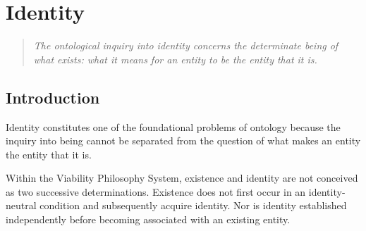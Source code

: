 
%
%
%
%
%
%
%
%
%



\chapter{Identity}
\label{ch:identity}



\def\CurrentChapterID{VS.B01.P01.C01}
\def\CurrentChapterTitle{Identity}



\begin{quote}
\textit{
The ontological inquiry into identity concerns the
determinate being of what exists: what it means for
an entity to be the entity that it is.
}
\end{quote}



\section*{Introduction}

Identity constitutes one of the foundational problems
of ontology because the inquiry into being cannot be
separated from the question of what makes an entity
the entity that it is.

Within the Viability Philosophy System, existence and
identity are not conceived as two successive
determinations. Existence does not first occur in an
identity-neutral condition and subsequently acquire
identity. Nor is identity established independently
before becoming associated with an existing entity.

